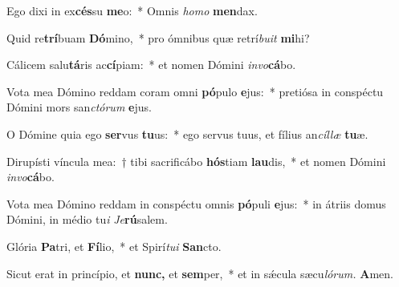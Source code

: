 \item Ego dixi in ex\textbf{cés}su \textbf{me}o:~* Omnis \textit{homo} \textbf{men}dax.
\item Quid re\textbf{trí}buam \textbf{Dó}mino,~* pro ómnibus quæ retrí\textit{buit} \textbf{mi}hi?
\item Cálicem salu\textbf{tá}ris ac\textbf{cí}piam:~* et nomen Dómini \textit{invo}\teenyhspace\textbf{cá}bo.
\item Vota mea Dómino reddam coram omni \textbf{pó}pulo \textbf{e}jus:~* pretiósa in conspéctu Dómini mors san\textit{ctórum} \textbf{e}jus.
\item O Dómine quia ego \textbf{ser}vus \textbf{tu}us:~* ego servus tuus, et fílius an\hspace*{0.02em}\textit{cíllæ} \textbf{tu}æ.
\item Dirupísti víncula mea:~† tibi sacrificábo \textbf{hós}tiam \textbf{lau}dis,~* et nomen Dómini \textit{invo}\teenyhspace\textbf{cá}bo.
\item Vota mea Dómino reddam in conspéctu omnis \textbf{pó}puli \textbf{e}jus:~* in átriis domus Dómini, in médio tu\tinyhspace\textit{i} \textit{Je}\textbf{rú}salem.
\item Glória \textbf{Pa}tri, et \textbf{Fí}lio,~* et Spirí\tinyhspace\textit{tui} \textbf{San}cto.
\item Sicut erat in princípio, et \textbf{nunc,} et \textbf{sem}per,~* et in sǽcula sæcu\tinyhspace\textit{lórum.} \textbf{A}men.